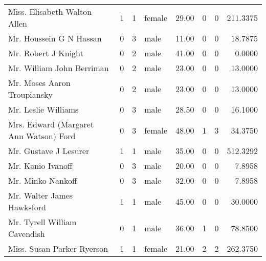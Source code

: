 \begin{tabular}{lrrlrrrr}
Miss. Elisabeth Walton Allen                       &         1 &       1 &  female &  29.00 &                        0 &                        0 &  211.3375 \\
Mr. Houssein G N Hassan                            &         0 &       3 &    male &  11.00 &                        0 &                        0 &   18.7875 \\
Mr. Robert J Knight                                &         0 &       2 &    male &  41.00 &                        0 &                        0 &    0.0000 \\
Mr. William John Berriman                          &         0 &       2 &    male &  23.00 &                        0 &                        0 &   13.0000 \\
Mr. Moses Aaron Troupiansky                        &         0 &       2 &    male &  23.00 &                        0 &                        0 &   13.0000 \\
Mr. Leslie Williams                                &         0 &       3 &    male &  28.50 &                        0 &                        0 &   16.1000 \\
Mrs. Edward (Margaret Ann Watson) Ford             &         0 &       3 &  female &  48.00 &                        1 &                        3 &   34.3750 \\
Mr. Gustave J Lesurer                              &         1 &       1 &    male &  35.00 &                        0 &                        0 &  512.3292 \\
Mr. Kanio Ivanoff                                  &         0 &       3 &    male &  20.00 &                        0 &                        0 &    7.8958 \\
Mr. Minko Nankoff                                  &         0 &       3 &    male &  32.00 &                        0 &                        0 &    7.8958 \\
Mr. Walter James Hawksford                         &         1 &       1 &    male &  45.00 &                        0 &                        0 &   30.0000 \\
Mr. Tyrell William Cavendish                       &         0 &       1 &    male &  36.00 &                        1 &                        0 &   78.8500 \\
Miss. Susan Parker Ryerson                         &         1 &       1 &  female &  21.00 &                        2 &                        2 &  262.3750 \\

\end{tabular}
